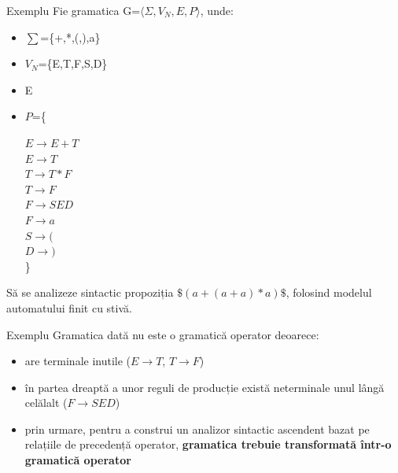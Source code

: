 \documentclass[pdf]{beamer}
\begin{document}
\begin{frame}{Exemplu}
Fie gramatica G=$\langle \Sigma, V_N, E, P \rangle$, unde:

\begin{itemize}
\item
$\sum$=\{+,*,(,),a\}
\item
$V_N$=\{E,T,F,S,D\}
\item
E
\item
$P$=\{

\hspace{1cm} $E \rightarrow E+T$
\\
\hspace{1cm} $E \rightarrow T$
\\
\hspace{1cm} $T \rightarrow T*F$
\\
\hspace{1cm} $T \rightarrow F$
\\
\hspace{1cm} $F \rightarrow S E D$
\\
\hspace{1cm} $F \rightarrow a$
\\
\hspace{1cm} $S \rightarrow ($
\\
\hspace{1cm} $D \rightarrow )$
\\
\}
\end{itemize}

Să se analizeze sintactic propoziția $\$(a+(a+a)*a)\$$, folosind modelul automatului finit cu stivă.
\end{frame}



\begin{frame}{Exemplu}
Gramatica dată nu este o gramatică operator deoarece:
\begin{itemize}
\item
are terminale inutile ($E \rightarrow T$, $T \rightarrow F$)
\item
în partea dreaptă a unor reguli de producție există neterminale unul lângă celălalt ($F \rightarrow S E D$)
\item
prin urmare, pentru a construi un analizor sintactic ascendent bazat pe relațiile de precedență operator, \textbf{gramatica trebuie transformată într-o gramatică operator}
\end{itemize}
\end{frame}
\end{document}
